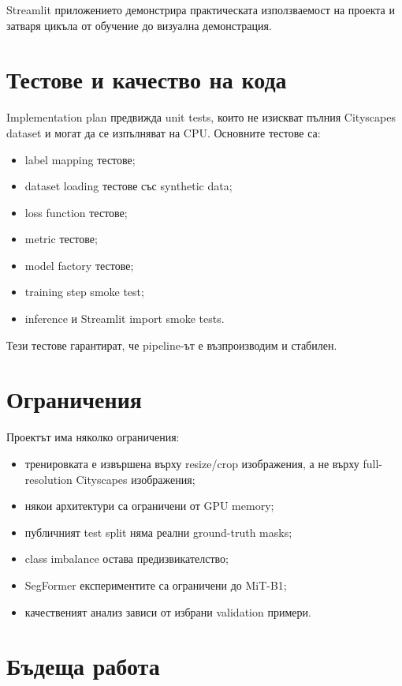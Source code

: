 \documentclass[12pt,a4paper]{article}
\begin{document}
Streamlit приложението демонстрира практическата използваемост на проекта и затваря цикъла от обучение до визуална демонстрация.

\section{Тестове и качество на кода}

Implementation plan предвижда unit tests, които не изискват пълния Cityscapes dataset и могат да се изпълняват на CPU. Основните тестове са:

\begin{itemize}
  \item label mapping тестове;
  \item dataset loading тестове със synthetic data;
  \item loss function тестове;
  \item metric тестове;
  \item model factory тестове;
  \item training step smoke test;
  \item inference и Streamlit import smoke tests.
\end{itemize}

Тези тестове гарантират, че pipeline-ът е възпроизводим и стабилен.

\section{Ограничения}

Проектът има няколко ограничения:

\begin{itemize}
  \item тренировката е извършена върху resize/crop изображения, а не върху full-resolution Cityscapes изображения;
  \item някои архитектури са ограничени от GPU memory;
  \item публичният test split няма реални ground-truth masks;
  \item class imbalance остава предизвикателство;
  \item SegFormer експериментите са ограничени до MiT-B1;
  \item качественият анализ зависи от избрани validation примери.
\end{itemize}

\section{Бъдеща работа}
\end{document}

